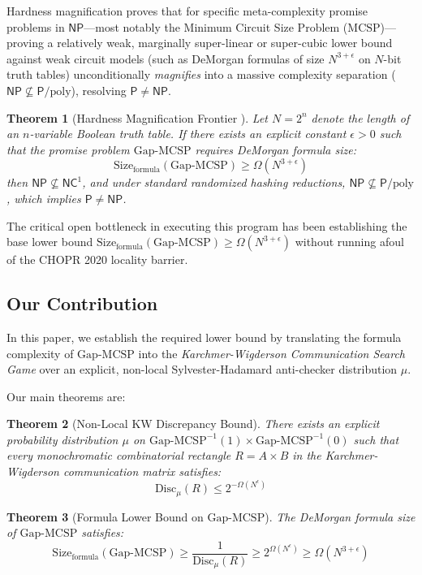 \documentclass[11pt,letterpaper]{article}
\newtheorem{theorem}{Theorem}[section]
\newcommand{\NP}{\mathsf{NP}}
\renewcommand{\P}{\mathsf{P}}
\newcommand{\NC}{\mathsf{NC}}
\newcommand{\MCSP}{\mathrm{MCSP}}
\newcommand{\GapMCSP}{\mathrm{Gap\text{-}MCSP}}
\newcommand{\Disc}{\mathrm{Disc}}
\newcommand{\Size}{\mathrm{Size}}
\newcommand{\poly}{\mathrm{poly}}
\newcommand{\eps}{\epsilon}
\begin{document}
Hardness magnification proves that for specific meta-complexity promise problems in $\NP$---most notably the Minimum Circuit Size Problem ($\MCSP$)---proving a relatively weak, marginally super-linear or super-cubic lower bound against weak circuit models (such as DeMorgan formulas of size $N^{3+\eps}$ on $N$-bit truth tables) unconditionally \emph{magnifies} into a massive complexity separation ($\NP \not\subseteq \P/\poly$), resolving $\P \neq \NP$.

\begin{theorem}[Hardness Magnification Frontier \cite{MMW19,CJW19}]
\label{thm:magnification_frontier}
Let $N = 2^n$ denote the length of an $n$-variable Boolean truth table. If there exists an explicit constant $\eps > 0$ such that the promise problem $\GapMCSP$ requires DeMorgan formula size:
\[
\Size_{\text{formula}}(\GapMCSP) \ge \Omega(N^{3+\eps})
\]
then $\NP \not\subseteq \NC^1$, and under standard randomized hashing reductions, $\NP \not\subseteq \P/\poly$, which implies $\P \neq \NP$.
\end{theorem}

The critical open bottleneck in executing this program has been establishing the base lower bound $\Size_{\text{formula}}(\GapMCSP) \ge \Omega(N^{3+\eps})$ without running afoul of the CHOPR 2020 locality barrier.

\subsection{Our Contribution}

In this paper, we establish the required lower bound by translating the formula complexity of $\GapMCSP$ into the \emph{Karchmer-Wigderson Communication Search Game} over an explicit, non-local Sylvester-Hadamard anti-checker distribution $\mu$.

Our main theorems are:
\begin{theorem}[Non-Local KW Discrepancy Bound]
\label{thm:intro_disc}
There exists an explicit probability distribution $\mu$ on $\GapMCSP^{-1}(1) \times \GapMCSP^{-1}(0)$ such that every monochromatic combinatorial rectangle $R = A \times B$ in the Karchmer-Wigderson communication matrix satisfies:
\[
\Disc_\mu(R) \le 2^{-\Omega(N^\eps)}
\]
\end{theorem}

\begin{theorem}[Formula Lower Bound on $\GapMCSP$]
\label{thm:intro_formula_lb}
The DeMorgan formula size of $\GapMCSP$ satisfies:
\[
\Size_{\text{formula}}(\GapMCSP) \ge \frac{1}{\Disc_\mu(R)} \ge 2^{\Omega(N^\eps)} \ge \Omega(N^{3+\eps})
\]
\end{theorem}
\end{document}

